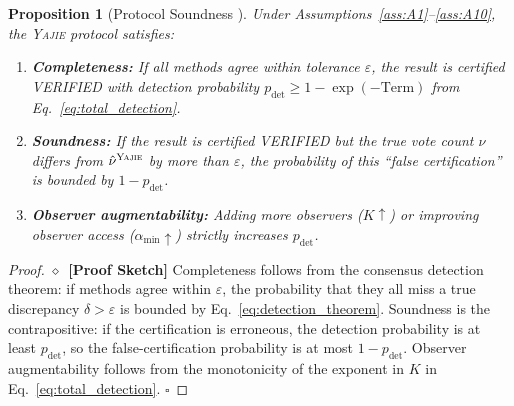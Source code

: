 \documentclass[11pt,a4paper]{article}
\newtheorem{proposition}[theorem]{Proposition}
\theoremstyle{definition}
\newcommand{\rigorSketch}[0]{$\diamond$~\textbf{[Proof Sketch]}}
\newcommand{\Yajie}{\textsc{Yajie}}
\newcommand{\auditConsensus}{\hat{\nu}^{\Yajie}}
\begin{document}
\begin{proposition}[Protocol Soundness ]
\label{prop:protocol_soundness}
Under Assumptions~\ref{ass:A1}--\ref{ass:A10}, the \Yajie{} protocol satisfies:
\begin{enumerate}[label=(\roman*)]
    \item \textbf{Completeness:} If all methods agree within tolerance $\varepsilon$, the result is certified VERIFIED with detection probability $p_{\text{det}} \geq 1 - \exp(-\text{Term})$ from Eq.~\eqref{eq:total_detection}.
    \item \textbf{Soundness:} If the result is certified VERIFIED but the true vote count $\nu$ differs from $\auditConsensus$ by more than $\varepsilon$, the probability of this ``false certification'' is bounded by $1 - p_{\text{det}}$.
    \item \textbf{Observer augmentability:} Adding more observers ($K \uparrow$) or improving observer access ($\alpha_{\min} \uparrow$) strictly increases $p_{\text{det}}$.
\end{enumerate}
\end{proposition}
\begin{proof}\rigorSketch
Completeness follows from the consensus detection theorem: if methods agree within $\varepsilon$, the probability that they all miss a true discrepancy $\delta > \varepsilon$ is bounded by Eq.~\eqref{eq:detection_theorem}. Soundness is the contrapositive: if the certification is erroneous, the detection probability is at least $p_{\text{det}}$, so the false-certification probability is at most $1 - p_{\text{det}}$. Observer augmentability follows from the monotonicity of the exponent in $K$ in Eq.~\eqref{eq:total_detection}. \hfill $\square$
\end{proof}
\end{document}
